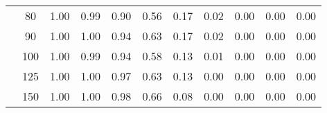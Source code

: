 \begin{table}[t]
\begin{center}
\begin{subtable}[c]{\textwidth}
\begin{center}
\begin{tabular}{rcccccccccc}
                                            & \multicolumn{1}{c|}{80}  & \num{1.00}  & \num{0.99}  & \num{0.90}  & \num{0.56}  & \num{0.17}  & \num{0.02}  & \num{0.00}  & \num{0.00}  & \num{0.00}  \\
                                            & \multicolumn{1}{c|}{90}  & \num{1.00}  & \num{1.00}  & \num{0.94}  & \num{0.63}  & \num{0.17}  & \num{0.02}  & \num{0.00}  & \num{0.00}  & \num{0.00}  \\
                                            & \multicolumn{1}{c|}{100}  & \num{1.00}  & \num{0.99}  & \num{0.94}  & \num{0.58}  & \num{0.13}  & \num{0.01}  & \num{0.00}  & \num{0.00}  & \num{0.00}  \\
                                            & \multicolumn{1}{c|}{125}  & \num{1.00}  & \num{1.00}  & \num{0.97}  & \num{0.63}  & \num{0.13}  & \num{0.00}  & \num{0.00}  & \num{0.00}  & \num{0.00}  \\
                                            & \multicolumn{1}{c|}{150}  & \num{1.00}  & \num{1.00}  & \num{0.98}  & \num{0.66}  & \num{0.08}  & \num{0.00}  & \num{0.00}  & \num{0.00}  & \num{0.00}  \\
                                    \end{tabular}
            \end{center}
        \end{subtable}

        \vspace{5mm}


\end{center}
\end{table}
